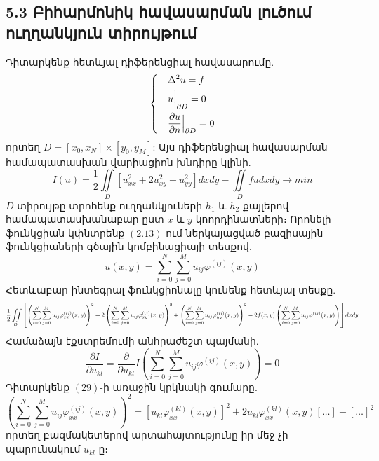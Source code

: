 \documentclass[fleqn, bachelor,subf,12pt,notitlepage]{article}
\newcommand\scalemath[2]{\scalebox{#1}{\mbox{\ensuremath{\displaystyle #2}}}}
\begin{document}
\subsection*{{5.3 Բիհարմոնիկ հավասարման լուծում ուղղանկյուն տիրույթում}}
Դիտարկենք հետևյալ դիֆերենցիալ հավասարումը.
\begin{equation}
\begin{dcases}
&\Delta^{2} u =f \\
&u \Big |_{\partial D} = 0\\
&\dfrac{\partial u}{\partial n} \Big |_{\partial D} = 0
\end{dcases}
\end{equation}
որտեղ $D = \left[x_{0}, x_{N}\right] \times \left[y_{0}, y_{M}\right]$:
Այս դիֆերենցիալ հավասարման  համապատասխան վարիացիոն խնդիրը կլինի.
\begin{equation}
I(u) = \frac{1}{2}\iint \limits_{D} \left[u_{xx}^{2} + 2u_{xy}^{2} + u_{yy}^{2} \right]dxdy - \iint \limits_{D} fudxdy \longrightarrow min
\end{equation}
$D$ տիրույթը տրոհենք ուղղանկյուների $h_{1}$ և $h_{2}$ քայլերով համապատասխանաբար ըստ $x$ և $y$ կոորդինատների։
Որոնելի ֆունկցիան կփնտրենք $\left(2.13\right)$ ում ներկայացված բազիսային ֆունկցիաների գծային կոմբինացիայի տեսքով.
\begin{equation}
u(x,y) = \sum_{i=0}^{N} \sum_{j=0}^{M} u_{ij}\varphi^{(ij)}(x,y)
\end{equation}
Հետևաբար ինտեգրալ ֆունկցիոնալը կունենք հետևյալ տեսքը.
\begin{equation}
$$\scalemath{0.7}{\frac{1}{2} \iint \limits_{D}\left[\left(\sum_{i=0}^{N} \sum_{j=0}^{M}u_{ij}\varphi^{(ij)}_{xx}(x,y)\right)^2 +  2\left(\sum_{i=0}^{N} \sum_{j=0}^{M}u_{ij}\varphi^{(ij)}_{xy}(x,y)\right)^2 + \left(\sum_{i=0}^{N} \sum_{j=0}^{M}u_{ij}\varphi^{(ij)}_{yy}(x,y)\right)^2-2f(x,y)\left(\sum_{i=0}^{N} \sum_{j=0}^{M}u_{ij}\varphi^{(ij)}(x,y)\right)\right]dxdy}
\end{equation}
Համաձայն էքստրեմումի անհրաժեշտ պայմանի.
\begin{equation}
\dfrac{\partial I}{ \partial u_{kl}} = \dfrac{\partial}{\partial u_{kl}} I \left(\sum_{i=0}^{N}\sum_{j=0}^{M} u_{ij}\varphi^{(ij)}(x,y)\right) = 0
\end{equation}
Դիտարկենք $\left(29\right)$-ի առաջին կրկնակի գումարը.
$$\left(\sum_{i=0}^{N} \sum_{j=0}^{M}u_{ij}\varphi_{xx}^{(ij)}(x,y)\right)^2 = \left[u_{kl}\varphi_{xx}^{(kl)}(x,y)\right]^{2} + 2u_{kl}\varphi_{xx}^{(kl)}(x,y)[\dots] + [\dots]^2$$
\noindent որտեղ բազմակետերով արտահայտությունը իր մեջ չի պարունակում $u_{kl}$ ը։
\end{document}
